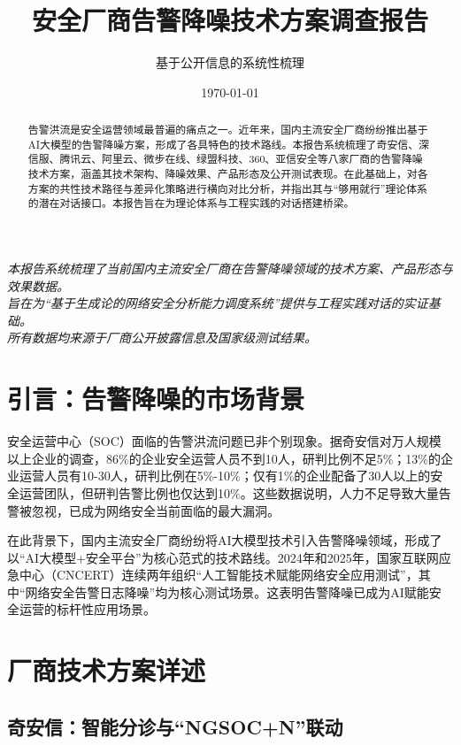 \documentclass[11pt,a4paper]{article}
\title{安全厂商告警降噪技术方案调查报告}
\author{基于公开信息的系统性梳理}
\date{\today}
\begin{document}
\maketitle

\begin{center}
\textit{
本报告系统梳理了当前国内主流安全厂商在告警降噪领域的技术方案、产品形态与效果数据。\\
旨在为“基于生成论的网络安全分析能力调度系统”提供与工程实践对话的实证基础。\\
所有数据均来源于厂商公开披露信息及国家级测试结果。
}
\end{center}

\vspace{5mm}

\begin{abstract}
告警洪流是安全运营领域最普遍的痛点之一。近年来，国内主流安全厂商纷纷推出基于AI大模型的告警降噪方案，形成了各具特色的技术路线。本报告系统梳理了奇安信、深信服、腾讯云、阿里云、微步在线、绿盟科技、360、亚信安全等八家厂商的告警降噪技术方案，涵盖其技术架构、降噪效果、产品形态及公开测试表现。在此基础上，对各方案的共性技术路径与差异化策略进行横向对比分析，并指出其与“够用就行”理论体系的潜在对话接口。本报告旨在为理论体系与工程实践的对话搭建桥梁。
\end{abstract}

\tableofcontents

\section{引言：告警降噪的市场背景}

安全运营中心（SOC）面临的告警洪流问题已非个别现象。据奇安信对万人规模以上企业的调查，86\%的企业安全运营人员不到10人，研判比例不足5\%；13\%的企业运营人员有10-30人，研判比例在5\%-10\%；仅有1\%的企业配备了30人以上的安全运营团队，但研判告警比例也仅达到10\%。这些数据说明，人力不足导致大量告警被忽视，已成为网络安全当前面临的最大漏洞。

在此背景下，国内主流安全厂商纷纷将AI大模型技术引入告警降噪领域，形成了以“AI大模型+安全平台”为核心范式的技术路线。2024年和2025年，国家互联网应急中心（CNCERT）连续两年组织“人工智能技术赋能网络安全应用测试”，其中“网络安全告警日志降噪”均为核心测试场景。这表明告警降噪已成为AI赋能安全运营的标杆性应用场景。

\section{厂商技术方案详述}

\subsection{奇安信：智能分诊与“NGSOC+N”联动}
\end{document}

